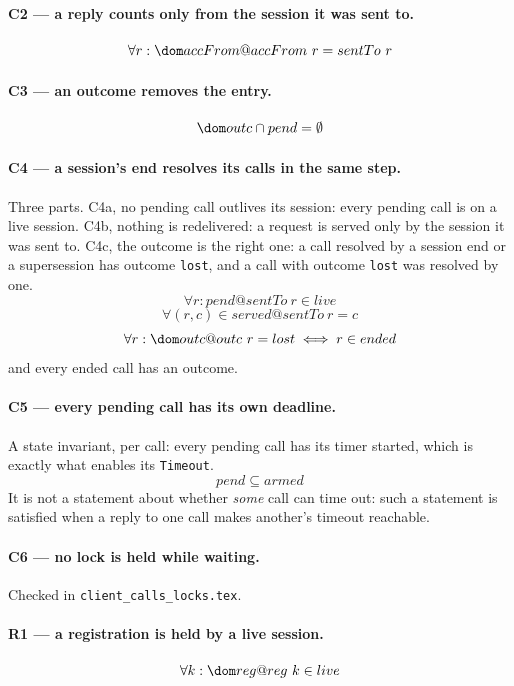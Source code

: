 \documentclass[a4paper,10pt,fleqn]{article}
\begin{document}
\paragraph{C2 --- a reply counts only from the session it was sent to.}
\[
  \forall r : \dom accFrom @ accFrom~r = sentTo~r
\]

\paragraph{C3 --- an outcome removes the entry.}
\[
  \dom outc \cap pend = \emptyset
\]

\paragraph{C4 --- a session's end resolves its calls in the same step.}
Three parts.  C4a, no pending call outlives its session: every pending call
is on a live session.  C4b, nothing is redelivered: a request is served only
by the session it was sent to.  C4c, the outcome is the right one: a call
resolved by a session end or a supersession has outcome \texttt{lost}, and a
call with outcome \texttt{lost} was resolved by one.
\[
  \forall r : pend @ sentTo~r \in live
\]
\[
  \forall (r , c) \in served @ sentTo~r = c
\]
\[
  \forall r : \dom outc @ outc~r = lost \iff r \in ended
\]
and every ended call has an outcome.

\paragraph{C5 --- every pending call has its own deadline.}
A state invariant, per call: every pending call has its timer started, which
is exactly what enables its \texttt{Timeout}.
\[
  pend \subseteq armed
\]
It is not a statement about whether \emph{some} call can time out: such a
statement is satisfied when a reply to one call makes another's timeout
reachable.

\paragraph{C6 --- no lock is held while waiting.}
Checked in \texttt{client\_calls\_locks.tex}.

\paragraph{R1 --- a registration is held by a live session.}
\[
  \forall k : \dom reg @ reg~k \in live
\]
\end{document}
